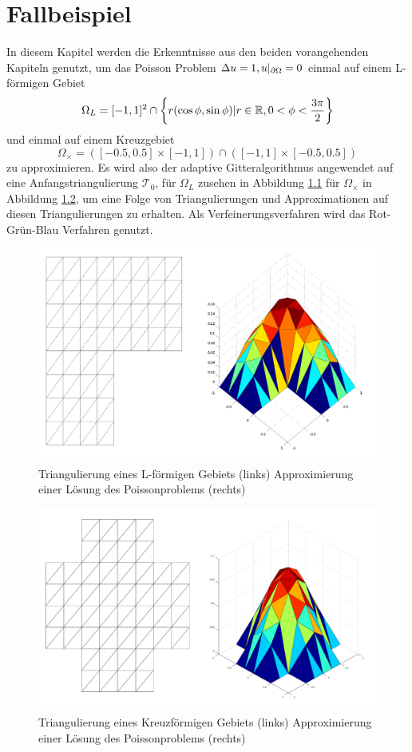 \chapter{Fallbeispiel}
In diesem Kapitel werden die Erkenntnisse aus den beiden vorangehenden Kapiteln genutzt, um das Poisson Problem $\Delta u = 1, u|_{\partial \Omega} = 0$ einmal auf einem L-förmigen Gebiet   
\[
\Omega_L = [-1,1]^2 \cap \left\{ r(\cos\phi,\sin\phi)| r\in\mathbb{R},0<\phi<\frac{3 \pi}{2} \right\}
\]
und einmal auf einem Kreuzgebiet
\[
\Omega_\times = ([-0.5,0.5] \times [-1,1]) \cap ([-1,1]\times[-0.5,0.5])
\]
zu approximieren. Es wird also der adaptive Gitteralgorithmus angewendet auf eine Anfangstriangulierung $\mathscr{T}_0$, für $\Omega_L$ zusehen in Abbildung \ref{grid} für $\Omega_\times$ in Abbildung \ref{grid2}, um eine Folge von Triangulierungen und Approximationen auf diesen Triangulierungen zu erhalten. Als Verfeinerungsverfahren wird das Rot-Grün-Blau Verfahren genutzt.

\begin{figure}[!htbp]
	\begin{center}
		\includegraphics[width=11.2cm]{pics/nonref.png}
	\end{center}
	\caption{\label{grid}Triangulierung eines L-förmigen Gebiets (links) Approximierung einer Lösung des Poissonproblems (rechts)}
\end{figure}
\begin{figure}[!htbp]
	\begin{center}
		\includegraphics[width=13cm]{pics/nonref2.png}
	\end{center}
	\caption{\label{grid2}Triangulierung eines Kreuzförmigen Gebiets (links) Approximierung einer Lösung des Poissonproblems (rechts)}
\end{figure}
